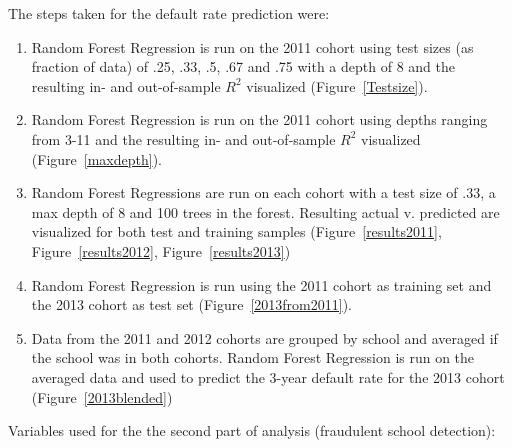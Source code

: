 \documentclass[10pt,twocolumn]{article}
\begin{document}
The steps taken for the default rate prediction were:
\begin{enumerate}
\item Random Forest Regression is run on the 2011 cohort using test sizes (as fraction of data) of .25, .33,
.5, .67 and .75 with a depth of 8 and the resulting in- and out-of-sample $R^2$
visualized (Figure~\ref{Testsize}).
\item Random Forest Regression is run on the 2011 cohort using depths ranging from 3-11 and the
resulting in- and out-of-sample $R^2$ visualized (Figure~\ref{maxdepth}).
\item Random Forest Regressions are run on each cohort with a test size of .33, a
max depth of 8 and 100 trees in the forest. Resulting actual v. predicted are visualized for both test and training samples
(Figure~\ref{results2011}, Figure~\ref{results2012}, Figure~\ref{results2013})
\item Random Forest Regression is run using the 2011 cohort as training set and the
2013 cohort as test set (Figure~\ref{2013from2011}).
\item Data from the 2011 and 2012 cohorts are grouped by school and averaged if the
school was in both cohorts. Random Forest Regression is run on the averaged data and used to
predict the 3-year default rate for the 2013 cohort (Figure~\ref{2013blended})
\end{enumerate}

Variables used for the the second part of analysis (fraudulent school detection):
\end{document}
